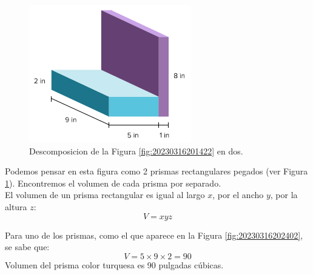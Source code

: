 \begin{solutionbox}{16cm}
    \begin{minipage}[t]{.3\textwidth}
        \begin{figure}[H]
            \centering
            \includegraphics[width=0.9\linewidth]{../images/20230316201857}
            \caption{Descomposicion de la Figura \ref{fig:20230316201422} en dos.}
            \label{fig:20230316201857}
        \end{figure}
    \end{minipage}\hfill
    \begin{minipage}[t]{.55\textwidth}
        Podemos pensar en esta figura como 2 prismas rectangulares pegados (ver Figura \ref{fig:20230316201857}). Encontremos el volumen de cada prisma por separado.\\
        El volumen de un prisma rectangular es igual al largo $x$, por el ancho $y$, por la altura $z$:
        \[ V = xyz \]

        Para uno de los prismas, como el que aparece en la Figura \ref{fig:20230316202402}, se sabe que:\\
        \[ V = 5\times 9\times 2=90\]
        Volumen del prisma color turquesa es 90 pulgadas cúbicas.\\


\end{minipage}
\end{solutionbox}
